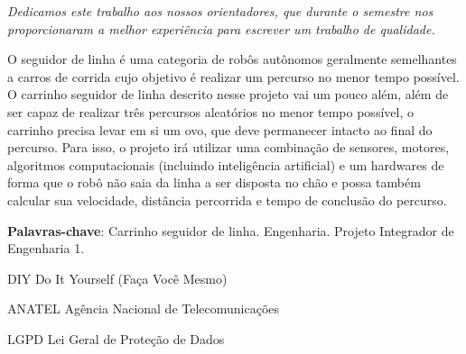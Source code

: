 \documentclass[
  12pt, %
  openright, %
  twoside, %
  a4paper, %
  english, %
  french, %
  spanish, %
  brazil %
]{abntex2}
\newcommand{\listofquadrosname}{Lista de quadros}
\begin{document}
%
%
\begin{dedicatoria}
  \vspace*{\fill}
  \centering
  \noindent
  \textit{
    Dedicamos este trabalho aos nossos orientadores, que durante o semestre nos
    proporcionaram a melhor experiência para escrever um trabalho de qualidade.
  } \vspace*{\fill}
\end{dedicatoria}

%
%

%
%

\setlength{\absparsep}{18pt}
\begin{resumo}
  O seguidor de linha é uma categoria de robôs autônomos geralmente semelhantes
  a carros de corrida cujo objetivo é realizar um percurso no menor tempo
  possível. O carrinho seguidor de linha descrito nesse projeto vai um pouco
  além, além de ser capaz de realizar três percursos aleatórios no menor tempo
  possível, o carrinho precisa levar em si um ovo, que deve permanecer intacto
  ao final do percurso. Para isso, o projeto irá utilizar uma combinação de
  sensores, motores, algoritmos computacionais (incluindo inteligência
  artificial) e um hardwares de forma que o robô não saia da linha a ser
  disposta no chão e possa também calcular sua velocidade, distância percorrida
  e tempo de conclusão do percurso.

  \textbf{Palavras-chave}: Carrinho seguidor de linha. Engenharia. Projeto
    Integrador de Engenharia 1.
\end{resumo}

%
%
\listoffigures*
\cleardoublepage

%
%
\pdfbookmark[0]{\listofquadrosname}{loq}
\listofquadros*
\cleardoublepage

%
%
\listoftables*
\cleardoublepage

%
%
\begin{siglas}
  \item[DIY] Do It Yourself (Faça Você Mesmo)
  \item[ANATEL] Agência Nacional de Telecomunicações
  \item[LGPD] Lei Geral de Proteção de Dados
\end{siglas}
\end{document}
